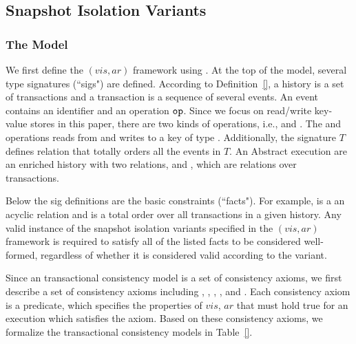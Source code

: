
\subsection{Snapshot Isolation Variants} \label{ss:si-variants}

\subsubsection{The \alloystar{} Model} \label{sss:si-alloystar}

We first define the $(vis,ar)$ framework using \alloy.
At the top of the model, several type signatures (``sigs") are defined.
According to Definition~\ref{}, a history is a set of transactions and
a transaction is a sequence of several events.
An event contains an identifier \id{} and an operation $\texttt{op}$.
Since we focus on read/write key-value stores in this paper,
there are two kinds of operations, i.e., \Read{} and \Write.
The \Read{} and \Write{} operations reads from
and writes to a key of type \Key.
Additionally, the signature $T$ defines \po{} relation that
totally orders all the events in $T$.
An Abstract execution are an enriched history with two relations, \vis{} and \ar{},
which are relations over transactions.

Below the sig definitions are the basic constraints (``facts").
For example, \vis{} is a an acyclic relation 
and \ar{} is a total order over all transactions in a given history.
Any valid instance of the snapshot isolation variants specified in the $(vis,ar)$ framework
is required to satisfy all of the listed facts to be considered well-formed,
regardless of whether it is considered valid according to the variant.

Since an transactional consistency model is a set of consistency axioms, 
we first describe a set of consistency axioms 
including \internal{}, \ext{}, \noconflict{}, \prefix{}, \transvis{} and \totalvis.
Each consistency axiom is a predicate,
which specifies the properties of $vis$, $ar$ that must hold true for
an execution which satisfies the axiom.
Based on these consistency axioms,
we formalize the transactional consistency models in Table~\ref{}.

\subsubsection{\taskchecking} \label{sss:si-taskchecking}

\subsubsection{\taskgenerating} \label{sss:si-taskgenerating}

\subsubsection{\taskcomparing} \label{sss:si-taskcomparing}

